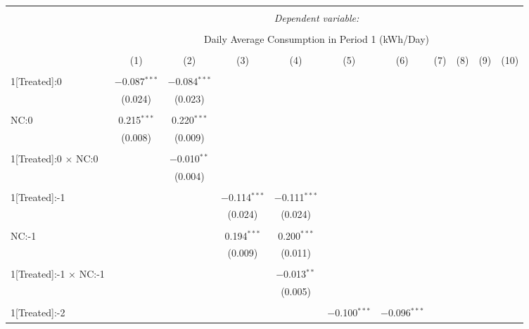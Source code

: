 
\begin{table}[!htbp] \centering 
  \caption{} 
  \label{} 
\tiny 
\begin{tabular}{@{\extracolsep{5pt}}lcccccccccc} 
\\[-1.8ex]\hline 
\hline \\[-1.8ex] 
 & \multicolumn{10}{c}{\textit{Dependent variable:}} \\ 
\cline{2-11} 
\\[-1.8ex] & \multicolumn{10}{c}{Daily Average Consumption in Period 1 (kWh/Day)} \\ 
\\[-1.8ex] & (1) & (2) & (3) & (4) & (5) & (6) & (7) & (8) & (9) & (10)\\ 
\hline \\[-1.8ex] 
 1[Treated]:0 & $-$0.087$^{***}$ & $-$0.084$^{***}$ &  &  &  &  &  &  &  &  \\ 
  & (0.024) & (0.023) &  &  &  &  &  &  &  &  \\ 
  & & & & & & & & & & \\ 
 NC:0 & 0.215$^{***}$ & 0.220$^{***}$ &  &  &  &  &  &  &  &  \\ 
  & (0.008) & (0.009) &  &  &  &  &  &  &  &  \\ 
  & & & & & & & & & & \\ 
 1[Treated]:0 $\times$ NC:0 &  & $-$0.010$^{**}$ &  &  &  &  &  &  &  &  \\ 
  &  & (0.004) &  &  &  &  &  &  &  &  \\ 
  & & & & & & & & & & \\ 
 1[Treated]:-1 &  &  & $-$0.114$^{***}$ & $-$0.111$^{***}$ &  &  &  &  &  &  \\ 
  &  &  & (0.024) & (0.024) &  &  &  &  &  &  \\ 
  & & & & & & & & & & \\ 
 NC:-1 &  &  & 0.194$^{***}$ & 0.200$^{***}$ &  &  &  &  &  &  \\ 
  &  &  & (0.009) & (0.011) &  &  &  &  &  &  \\ 
  & & & & & & & & & & \\ 
 1[Treated]:-1 $\times$ NC:-1 &  &  &  & $-$0.013$^{**}$ &  &  &  &  &  &  \\ 
  &  &  &  & (0.005) &  &  &  &  &  &  \\ 
  & & & & & & & & & & \\ 
 1[Treated]:-2 &  &  &  &  & $-$0.100$^{***}$ & $-$0.096$^{***}$ &  &  &  &  \\ 

\end{tabular}
\end{table}
